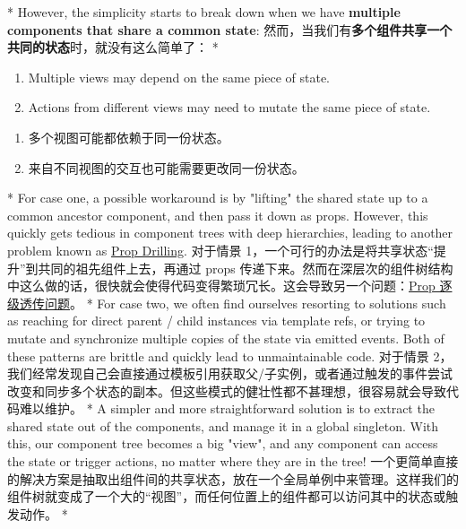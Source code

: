 \begin{paracol}{2}
 
\switchcolumn[0]*%
However, the simplicity starts to break down when we have
\textbf{multiple components that share a common state}:
\switchcolumn
然而，当我们有\textbf{多个组件共享一个共同的状态}时，就没有这么简单了：
\switchcolumn[0]*%
\begin{enumerate}
\item
  Multiple views may depend on the same piece of state.
\item
  Actions from different views may need to mutate the same piece of
  state.
\end{enumerate}
\switchcolumn
\begin{enumerate}
\item
  多个视图可能都依赖于同一份状态。
\item
  来自不同视图的交互也可能需要更改同一份状态。
\end{enumerate}
\switchcolumn[0]*%
For case one, a possible workaround is by "lifting" the shared state up
to a common ancestor component, and then pass it down as props. However,
this quickly gets tedious in component trees with deep hierarchies,
leading to another problem known as
\href{https://vuejs.org/guide/components/provide-inject.html\#prop-drilling}{Prop
Drilling}.
\switchcolumn
对于情景
1，一个可行的办法是将共享状态``提升''到共同的祖先组件上去，再通过 props
传递下来。然而在深层次的组件树结构中这么做的话，很快就会使得代码变得繁琐冗长。这会导致另一个问题：\href{https://cn.vuejs.org/guide/components/provide-inject.html\#prop-drilling}{Prop
逐级透传问题}。
\switchcolumn[0]*%
For case two, we often find ourselves resorting to solutions such as
reaching for direct parent / child instances via template refs, or
trying to mutate and synchronize multiple copies of the state via
emitted events. Both of these patterns are brittle and quickly lead to
unmaintainable code.
\switchcolumn
对于情景
2，我们经常发现自己会直接通过模板引用获取父/子实例，或者通过触发的事件尝试改变和同步多个状态的副本。但这些模式的健壮性都不甚理想，很容易就会导致代码难以维护。
\switchcolumn[0]*%
A simpler and more straightforward solution is to extract the shared
state out of the components, and manage it in a global singleton. With
this, our component tree becomes a big "view", and any component can
access the state or trigger actions, no matter where they are in the
tree!
\switchcolumn
一个更简单直接的解决方案是抽取出组件间的共享状态，放在一个全局单例中来管理。这样我们的组件树就变成了一个大的``视图''，而任何位置上的组件都可以访问其中的状态或触发动作。
\switchcolumn[0]*%

\end{paracol}
